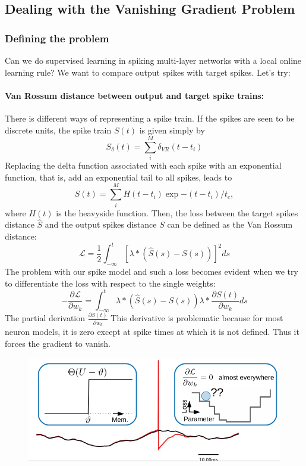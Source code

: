 \documentclass[main]{subfiles}
\begin{document}
\subsection{Dealing with the Vanishing Gradient Problem}

\subsubsection{Defining the problem}
Can we do supervised learning in spiking multi-layer networks with a local online learning rule? We want to compare output spikes with target spikes. Let's try:
\paragraph{Van Rossum distance between output and target spike trains:}
There is different ways of representing a spike train. If the spikes are seen to be discrete units, the spike train $S(t)$ is given simply by
%
\begin{equation}
    S_{\delta}(t) = \sum_i^M \delta_{VR}(t-t_i)
\end{equation}
%
Replacing the delta function associated with each spike with an exponential function, that is, add an exponential tail to all spikes, leads to
%
\begin{equation}
    S(t) = \sum_i^M H(t-t_i)\exp{-(t-t_i)/t_c},
\end{equation}
%
where $H(t)$ is the heavyside function. Then, the loss between the target spikes distance $\hat{S}$ and the output spikes distance $S$ can be defined as the Van Rossum distance:
%
\begin{equation}
\mathcal{L}=\frac{1}{2} \int_{-\infty}^{t}[\lambda *(\hat{S}(s)-S(s))]^{2} ds
\end{equation}
%
The problem with our spike model and such a loss becomes evident when we try to differentiate the loss with respect to the single weights:
%
\begin{equation}
-\frac{\partial \mathcal{L}}{\partial w_{k}}=\int_{-\infty}^{t} \lambda *(\hat{S}(s)-S(s)) \lambda * \frac{\partial S(t)}{\partial w_{k}} d s
\end{equation}
%
The partial derivation $\frac{\partial S(t)}{\partial w_{k}}$ This derivative is problematic because for most neuron models, it is zero except at spike times at which it is not defined. Thus it forces the gradient to vanish. 
%
\begin{figure}[H]
    \centering
    \includegraphics[width=0.8\linewidth]{10_DeepLearningWithSpikes/figures/vanishing.png}
    \caption{}
    \label{fig:my_label}
\end{figure}
%
\end{document}
